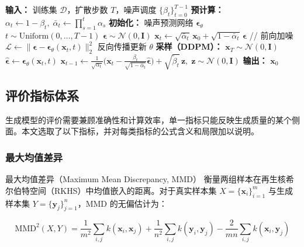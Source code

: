 \documentclass[UTF8,a4paper,12pt]{ctexart}
\newcommand{\Ncal}{\mathcal{N}}
\begin{document}
\begin{algorithm}[H]
\centering
\caption{DDPM 的训练与采样}
\label{alg:ddpm}
\begin{algorithmic}[1]
\State \textbf{输入：} 训练集 $\mathcal{D}$，扩散步数 $T$，噪声调度 $\{\beta_t\}_{t=0}^{T-1}$
\State \textbf{预计算：} $\alpha_t\gets 1-\beta_t,\;\bar{\alpha}_t\gets\prod_{s=1}^{t}\alpha_s$
\State \textbf{初始化：} 噪声预测网络 $\boldsymbol{\epsilon}_{\theta}$
        \State $t \sim \text{Uniform}(0,\dots,T-1)$
        \State $\boldsymbol{\epsilon} \sim \Ncal(0,\mathbf{I})$
        \State $\mathbf{x}_t \gets \sqrt{\bar{\alpha}_t}\,\mathbf{x}_0 + \sqrt{1-\bar{\alpha}_t}\,\boldsymbol{\epsilon}$ \quad // 前向加噪
        \State $\mathcal{L} \gets \|\boldsymbol{\epsilon} - \boldsymbol{\epsilon}_{\theta}(\mathbf{x}_t,t)\|_2^2$
        \State 反向传播更新 $\theta$
    \EndFor
\EndFor
\State \textbf{采样（DDPM）：}
\State $\mathbf{x}_T \sim \Ncal(0,\mathbf{I})$
    \State $\hat{\boldsymbol{\epsilon}} \gets \boldsymbol{\epsilon}_{\theta}(\mathbf{x}_t,t)$
    \State $\mathbf{x}_{t-1} \gets \frac{1}{\sqrt{\alpha_t}}\bigl(\mathbf{x}_t - \frac{\beta_t}{\sqrt{1-\bar{\alpha}_t}}\hat{\boldsymbol{\epsilon}}\bigr) + \sqrt{\tilde{\beta}_t}\,\mathbf{z},\;\mathbf{z}\sim\Ncal(0,\mathbf{I})$
\EndFor
\State \textbf{输出：} $\mathbf{x}_0$
\end{algorithmic}
\end{algorithm}

\subsection{评价指标体系}

生成模型的评价需要兼顾准确性和计算效率，单一指标只能反映生成质量的某个侧面。本文选取了以下指标，并对每类指标的公式含义和局限加以说明。

\subsubsection{最大均值差异}

最大均值差异（Maximum Mean Discrepancy, MMD）\cite{gretton2012mmd} 衡量两组样本在再生核希尔伯特空间（RKHS）中均值嵌入的距离。对于真实样本集 $X=\{\mathbf{x}_i\}_{i=1}^{m}$ 与生成样本集 $Y=\{\mathbf{y}_j\}_{j=1}^{n}$，MMD 的无偏估计为：

\begin{equation}
	\mathrm{MMD}^2(X,Y) = \frac{1}{m^2}\sum_{i,j}k(\mathbf{x}_i,\mathbf{x}_j) + \frac{1}{n^2}\sum_{i,j}k(\mathbf{y}_i,\mathbf{y}_j) - \frac{2}{mn}\sum_{i,j}k(\mathbf{x}_i,\mathbf{y}_j)
\end{equation}
\end{document}
